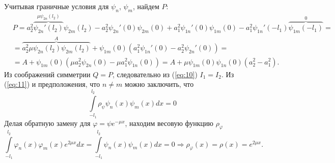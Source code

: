 \documentclass[12pt, a4paper, draft]{article}
\begin{document}
Учитывая граничные условия для $\psi_n$, $\psi_m$, найдем $P$:
\begin{equation}
  \begin{aligned}
    &P=a_2^2\overbrace{\psi_{2n}'(l_2)}^{\mu\psi_{2n}(l_2)}\psi_{2m}(l_2) - a_2^2 \psi_{2n}'(0) \psi_{2m}(0) + a_1^2 \psi_{1n}'(0) \psi_{1m}(0) - a_1^2 \psi_{1n}'(-l_1) \overbrace{\psi_{1m}(-l_1)}^0=\\
    & = \overbrace{a_2^2\mu\psi_{2n}(l_2)\psi_{2m}(l_2)}^{A} + \psi_{1m}(0)(a_1^2 \psi_{1n}'(0) - a_2^2\psi_{2n}'(0)) =\\
    & = A + \psi_{1m}(0)(\mu a_2^2 \psi_{2n}(0) - \mu a_1^2 \psi_{1n}(0)) = A + \mu \psi_{1m}(0)\psi_{1n}(0)(a_2^2 - a_1^2).
  \end{aligned}
\end{equation}
Из соображений симметрии $Q = P$, следовательно из (\ref{eq:10}) $I_1 = I_2$. Из (\ref{eq:11}) и предположения, что $n \ne m$ можно заключить, что
\begin{equation}
  \int \limits_{-l_1}^{l_2} \rho_\psi \psi_n(x) \psi_m(x) dx = 0
\end{equation}
Делая обратную замену для $\varphi = \psi e^{-\mu x}$, находим весовую функцию $\rho_\varphi$
\begin{equation}
  \int \limits_{-l_1}^{l_2} \varphi_n(x) \varphi_m(x) e^{2 \mu x} dx = \int \limits_{-l_1}^{l_2} \psi_n(x) \psi_m(x) dx = 0 \Rightarrow \rho_\varphi(x) = \rho(x) = e^{2 \mu x}.
\end{equation}
\end{document}

